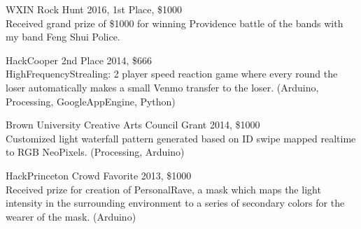 WXIN Rock Hunt 2016, 1st Place, \$1000  \\
Received grand prize of \$1000 for winning Providence battle of the bands with my band Feng Shui Police.

HackCooper 2nd Place 2014, \$666  \\
HighFrequencyStrealing: 2 player speed reaction game where every round the loser automatically makes a small Venmo transfer to the loser. (Arduino, Processing, GoogleAppEngine, Python)

Brown University Creative Arts Council Grant 2014, \$1000 \\
Customized light waterfall pattern generated based on ID swipe mapped realtime to RGB NeoPixels. (Processing, Arduino)

HackPrinceton Crowd Favorite 2013, \$1000 \\
Received prize for creation of PersonalRave, a mask which maps the light intensity in the surrounding environment to a series of secondary colors for the wearer of the mask. (Arduino)









 

